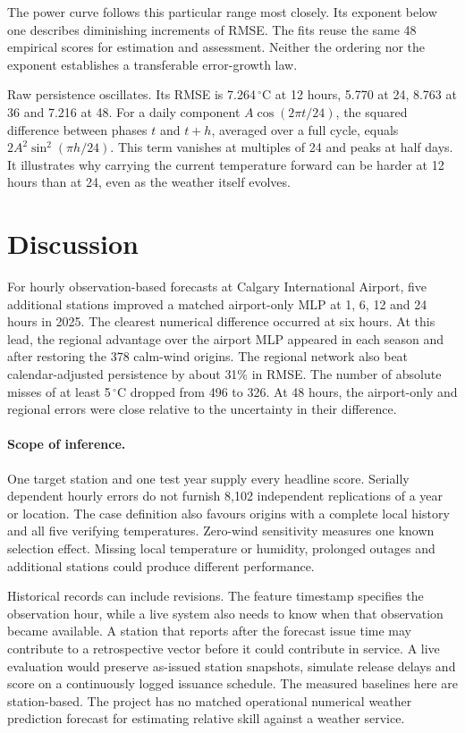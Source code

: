 \documentclass[11pt,letterpaper]{article}
\newcommand{\celsius}{\ensuremath{^{\circ}\mathrm{C}}}\newcommand{\code}[1]{\texttt{\small #1}}
\begin{document}
The power curve follows this particular range most closely. Its exponent below one describes diminishing increments of RMSE. The fits reuse the same 48 empirical scores for estimation and assessment. Neither the ordering nor the exponent establishes a transferable error-growth law.

Raw persistence oscillates. Its RMSE is 7.264\,\celsius{} at 12 hours, 5.770 at 24, 8.763 at 36 and 7.216 at 48. For a daily component $A\cos(2\pi t/24)$, the squared difference between phases $t$ and $t+h$, averaged over a full cycle, equals $2A^2\sin^2(\pi h/24)$. This term vanishes at multiples of 24 and peaks at half days. It illustrates why carrying the current temperature forward can be harder at 12 hours than at 24, even as the weather itself evolves.


\FloatBarrier

\section{Discussion}\label{limits}
For hourly observation-based forecasts at Calgary International Airport, five additional stations improved a matched airport-only MLP at 1, 6, 12 and 24 hours in 2025. The clearest numerical difference occurred at six hours. At this lead, the regional advantage over the airport MLP appeared in each season and after restoring the 378 calm-wind origins. The regional network also beat calendar-adjusted persistence by about 31\% in RMSE. The number of absolute misses of at least 5\,\celsius{} dropped from 496 to 326. At 48 hours, the airport-only and regional errors were close relative to the uncertainty in their difference.

\paragraph{Scope of inference.}
One target station and one test year supply every headline score. Serially dependent hourly errors do not furnish 8,102 independent replications of a year or location. The case definition also favours origins with a complete local history and all five verifying temperatures. Zero-wind sensitivity measures one known selection effect. Missing local temperature or humidity, prolonged outages and additional stations could produce different performance.

Historical records can include revisions. The feature timestamp specifies the observation hour, while a live system also needs to know when that observation became available. A station that reports after the forecast issue time may contribute to a retrospective vector before it could contribute in service. A live evaluation would preserve as-issued station snapshots, simulate release delays and score on a continuously logged issuance schedule. The measured baselines here are station-based. The project has no matched operational numerical weather prediction forecast for estimating relative skill against a weather service.
\end{document}
